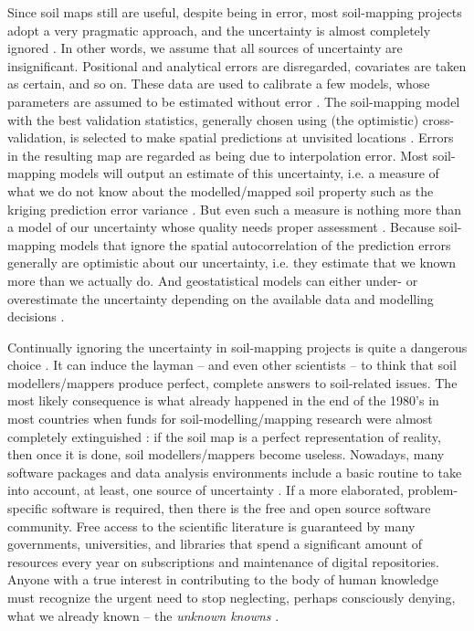 Since soil maps still are useful, despite being in error, most soil-mapping projects adopt a very
pragmatic approach, and the uncertainty is almost completely ignored \citep{McBratneyEtAl2003, 
ScullEtAl2003}. In other words, we assume that all sources of uncertainty are insignificant. 
Positional and analytical errors are disregarded, covariates are taken as certain, and so on. These 
data are used to calibrate a few models, whose parameters are assumed to be estimated without error 
\citep{DiggleEtAl1998}. The soil-mapping model with the best validation statistics, generally 
chosen using (the optimistic) cross-validation, is selected to make spatial predictions at unvisited
locations \citep{BrusEtAl2011}. Errors in the resulting map are regarded as being due to interpolation
error. Most soil-mapping models will output an estimate of this uncertainty, i.e. a measure of what 
we do not know about the modelled/mapped soil property such as the kriging prediction error variance
\citep{HeuvelinkEtAl1989}. But even such a measure is nothing more than a model of our uncertainty 
whose quality needs proper assessment \citep{Goovaerts2001}. Because soil-mapping models that ignore
the spatial autocorrelation of the prediction errors generally are optimistic about our uncertainty,
i.e. they estimate that we known more than we actually do. And geostatistical models can either 
under- or overestimate the uncertainty depending on the available data and modelling decisions 
\citep{Lark2000a}.

Continually ignoring the uncertainty in soil-mapping projects is quite a dangerous choice 
\citep{HeuvelinkEtAl1999}. It can induce the layman -- and even other scientists -- to think that 
soil modellers/mappers produce perfect, complete answers to soil-related issues. The most likely
consequence is what already happened in the end of the 1980's in most countries when funds for
soil-modelling/mapping research were almost completely extinguished \citep{Basher1997, Dalmolin1999,
Ker1999, Ramos2003, HarteminkEtAl2008, Finke2012}: if the soil map is a perfect representation of 
reality, then once it is done, soil modellers/mappers become useless. Nowadays, many 
software packages and data analysis environments include a basic routine to take into account, at 
least, one source of uncertainty \citep{ChristensenEtAl2002, Papritz2015, RibeiroJrEtAl2015}. If a 
more elaborated, problem-specific software is required, then there is the free and open source 
software community. Free access to the scientific literature is guaranteed by many governments, 
universities, and libraries that spend a significant amount of resources every year on subscriptions
and maintenance of digital repositories. Anyone with a true interest in contributing to the body of 
human knowledge must recognize the urgent need to stop neglecting, perhaps consciously denying, what
we already known -- the \textit{unknown knowns} \citep{Zizek2006}.

